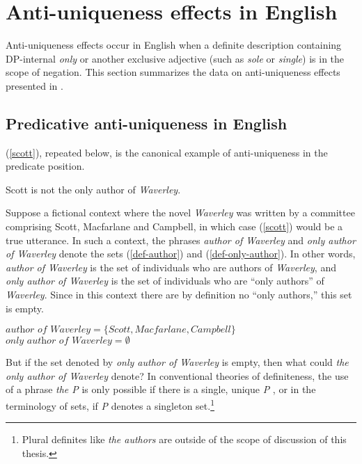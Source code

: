 \section{Anti-uniqueness effects in English \label{sec:anti-uniqueness-english}}
Anti-uniqueness effects occur in English when a definite description containing DP-internal \textit{only} or another exclusive adjective (such as \textit{sole} or \textit{single}) is in the scope of negation. This section summarizes the data on anti-uniqueness effects presented in \citet{cb2012b, cb2015}.

\subsection{Predicative anti-uniqueness in English}
(\ref{scott}), repeated below, is the canonical example of anti-uniqueness in the predicate position.

\begin{exe}
	 Scott is not the only author of \textit{Waverley}.
\end{exe}

Suppose a fictional context where the novel \textit{Waverley} was written by a committee comprising Scott, Macfarlane and Campbell, in which case (\ref{scott}) would be a true utterance. In such a context, the phrases \textit{author of Waverley} and \textit{only author of Waverley} denote the sets (\ref{def-author}) and (\ref{def-only-author}). In other words, \textit{author of Waverley} is the set of individuals who are authors of \textit{Waverley}, and \textit{only author of Waverley} is the set of individuals who are ``only authors'' of \textit{Waverley}. Since in this context there are by definition no ``only authors,'' this set is empty.

\begin{exe}
	\ex \label{def-author} $\textit{author of Waverley} = \lbrace Scott, Macfarlane, Campbell \rbrace$
	\ex \label{def-only-author} $\textit{only author of Waverley} = \emptyset$
\end{exe}

But if the set denoted by \textit{only author of Waverley} is empty, then what could \textit{the only author of Waverley} denote? In conventional theories of definiteness, the use of a phrase \textit{the P} is only possible if there is a single, unique \textit{P} \citep{horn-abbott-2012}, or in the terminology of sets, if \textit{P} denotes a singleton set.\footnote{Plural definites like \textit{the authors} are outside of the scope of discussion of this thesis.}

